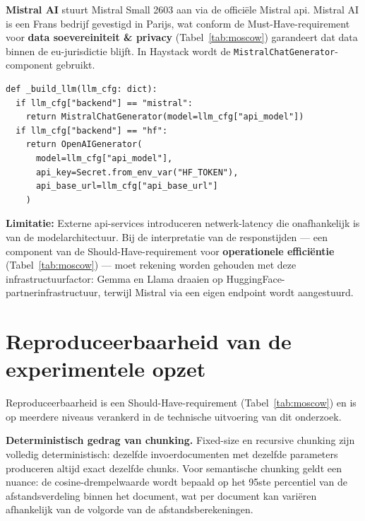 \textbf{Mistral AI} stuurt Mistral Small 2603 aan via de officiële Mistral \gls{api}. Mistral AI is een Frans bedrijf gevestigd in Parijs, wat conform de Must-Have-requirement voor \textbf{data soevereiniteit \& privacy} (Tabel~\ref{tab:moscow}) garandeert dat data binnen de \gls{eu}-jurisdictie blijft. In Haystack wordt de \texttt{MistralChatGenerator}-component gebruikt.

\begin{listing}[H]
\begin{verbatim}
def _build_llm(llm_cfg: dict):
  if llm_cfg["backend"] == "mistral":
    return MistralChatGenerator(model=llm_cfg["api_model"])
  if llm_cfg["backend"] == "hf":
    return OpenAIGenerator(
      model=llm_cfg["api_model"],
      api_key=Secret.from_env_var("HF_TOKEN"),
      api_base_url=llm_cfg["api_base_url"]
    )
\end{verbatim}
\caption[\_build\_llm: provider-selectie op basis van HyPSTER-configuratie]{De \gls{api}-basis-\gls{url} wordt uit de HyPSTER-configuratie gelezen (Sectie~\ref{sec:hypster-config}), wat per model een andere \gls{eu}-provider toelaat zonder conditielogica in de pipeline zelf.}
\label{lst:build-llm}
\end{listing}

\textbf{Limitatie:} Externe \gls{api}-services introduceren netwerk-latency die onafhankelijk is van de modelarchitectuur. Bij de interpretatie van de responstijden — een component van de Should-Have-requirement voor \textbf{operationele efficiëntie} (Tabel~\ref{tab:moscow}) — moet rekening worden gehouden met deze infrastructuurfactor: Gemma en Llama draaien op HuggingFace-partnerinfrastructuur, terwijl Mistral via een eigen endpoint wordt aangestuurd.

\section{Reproduceerbaarheid van de experimentele opzet}
\label{sec:reproduceerbaarheid}

Reproduceerbaarheid is een Should-Have-requirement (Tabel~\ref{tab:moscow}) en is op meerdere niveaus verankerd in de technische uitvoering van dit onderzoek.

\textbf{Deterministisch gedrag van chunking.} Fixed-size en recursive chunking zijn volledig deterministisch: dezelfde invoerdocumenten met dezelfde parameters produceren altijd exact dezelfde chunks. Voor semantische chunking geldt een nuance: de cosine-drempelwaarde wordt bepaald op het 95ste percentiel van de afstandsverdeling binnen het document, wat per document kan variëren afhankelijk van de volgorde van de afstandsberekeningen.

